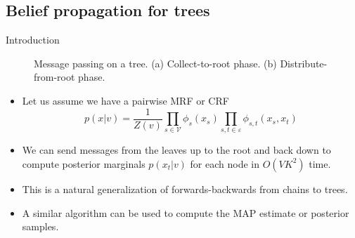 \documentclass[10pt,mathserif]{beamer}
\begin{document}
\subsection{Belief propagation for trees}
\begin{frame}{Introduction}
\begin{figure}[h]
\centering     %
{}
\caption{Message passing on a tree. (a) Collect-to-root phase. (b) Distribute-from-root phase.}
\end{figure}

\begin{itemize}
    \item Let us assume we have a pairwise MRF or CRF
    \begin{equation}
        p(x|v) = \frac{1}{Z(v)} \prod_{s\in \mathcal{V}} \phi_s(x_s)  \prod_{s,t\in \varepsilon} \phi_{s,t}(x_s,x_t)
    \end{equation}
    
    \item We can send messages from the leaves up to the root and back down to compute posterior marginals $p(x_t|v)$ for each node in $O(VK^2)$ time.
    \item This is a natural generalization of forwards-backwards from chains to trees.
    \item A similar algorithm can be used to compute the MAP estimate or posterior samples.
\end{itemize}
\end{frame}
\end{document}
